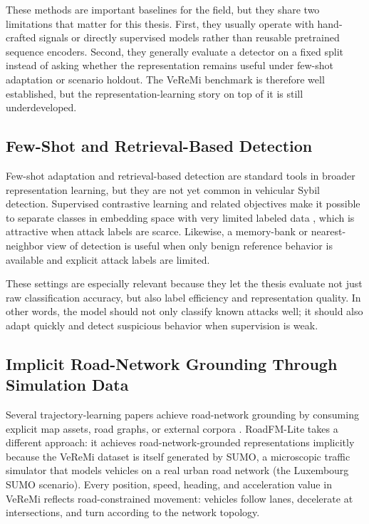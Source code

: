 \documentclass[12pt]{article}
\begin{document}
These methods are important baselines for the field, but they share two limitations that matter for this thesis. First, they usually operate with hand-crafted signals or directly supervised models rather than reusable pretrained sequence encoders. Second, they generally evaluate a detector on a fixed split instead of asking whether the representation remains useful under few-shot adaptation or scenario holdout. The VeReMi benchmark is therefore well established, but the representation-learning story on top of it is still underdeveloped.

\subsection{Few-Shot and Retrieval-Based Detection}

Few-shot adaptation and retrieval-based detection are standard tools in broader representation learning, but they are not yet common in vehicular Sybil detection. Supervised contrastive learning and related objectives make it possible to separate classes in embedding space with very limited labeled data \cite{chen2023self,lin2023pre}, which is attractive when attack labels are scarce. Likewise, a memory-bank or nearest-neighbor view of detection is useful when only benign reference behavior is available and explicit attack labels are limited.

These settings are especially relevant because they let the thesis evaluate not just raw classification accuracy, but also label efficiency and representation quality. In other words, the model should not only classify known attacks well; it should also adapt quickly and detect suspicious behavior when supervision is weak.

\subsection{Implicit Road-Network Grounding Through Simulation Data}

Several trajectory-learning papers achieve road-network grounding by consuming explicit map assets, road graphs, or external corpora \cite{mao2022jointly}. RoadFM-Lite takes a different approach: it achieves road-network-grounded representations implicitly because the VeReMi dataset is itself generated by SUMO, a microscopic traffic simulator that models vehicles on a real urban road network (the Luxembourg SUMO scenario). Every position, speed, heading, and acceleration value in VeReMi reflects road-constrained movement: vehicles follow lanes, decelerate at intersections, and turn according to the network topology.
\end{document}
